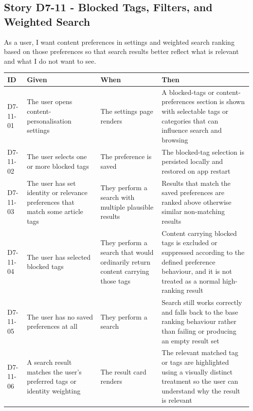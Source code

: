 \documentclass[a4paper, 12pt]{article}
\begin{document}
    \subsection{Story D7-11 - Blocked Tags, Filters, and Weighted Search}

    As a user, I want content preferences in settings and weighted search ranking
    based on those preferences so that search results better reflect what is relevant
    and what I do not want to see.

    \begin{longtable}
        {|L{0.12\textwidth}|L{0.24\textwidth}|L{0.24\textwidth}|L{0.32\textwidth}|}
        \hline \textbf{ID} & \textbf{Given} & \textbf{When} & \textbf{Then} \\
        \hline \endhead D7-11-01 & The user opens content-personalisation settings
        & The settings page renders & A blocked-tags or content-preferences section
        is shown with selectable tags or categories that can influence search and
        browsing \\
        \hline D7-11-02 & The user selects one or more blocked tags & The preference
        is saved & The blocked-tag selection is persisted locally and restored on
        app restart \\
        \hline D7-11-03 & The user has set identity or relevance preferences that
        match some article tags & They perform a search with multiple plausible results
        & Results that match the saved preferences are ranked above otherwise similar
        non-matching results \\
        \hline D7-11-04 & The user has selected blocked tags & They perform a search
        that would ordinarily return content carrying those tags & Content carrying
        blocked tags is excluded or suppressed according to the defined preference
        behaviour, and it is not treated as a normal high-ranking result \\
        \hline D7-11-05 & The user has no saved preferences at all & They
        perform a search & Search still works correctly and falls back to the
        base ranking behaviour rather than failing or producing an empty result
        set \\
        \hline D7-11-06 & A search result matches the user's preferred tags or
        identity weighting & The result card renders & The relevant matched tag
        or tags are highlighted using a visually distinct treatment so the user
        can understand why the result is relevant \\

\end{longtable}
\end{document}
